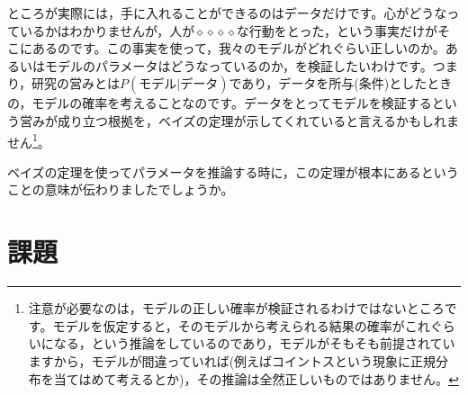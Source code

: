 \documentclass{ltjsarticle}
\begin{document}
ところが実際には，手に入れることができるのはデータだけです。心がどうなっているかはわかりませんが，人が$\diamond\diamond\diamond\diamond$な行動をとった，という事実だけがそこにあるのです。この事実を使って，我々のモデルがどれぐらい正しいのか。あるいはモデルのパラメータはどうなっているのか，を検証したいわけです。つまり，研究の営みとは$P(\mbox{モデル}|\mbox{データ})$であり，データを所与(条件)としたときの，モデルの確率を考えることなのです。データをとってモデルを検証するという営みが成り立つ根拠を，ベイズの定理が示してくれていると言えるかもしれません\footnote{注意が必要なのは，モデルの正しい確率が検証されるわけではないところです。モデルを仮定すると，そのモデルから考えられる結果の確率がこれぐらいになる，という推論をしているのであり，モデルがそもそも前提されていますから，モデルが間違っていれば(例えばコイントスという現象に正規分布を当てはめて考えるとか)，その推論は全然正しいものではありません。}。

ベイズの定理を使ってパラメータを推論する時に，この定理が根本にあるということの意味が伝わりましたでしょうか。


\section{課題}
\end{document}
